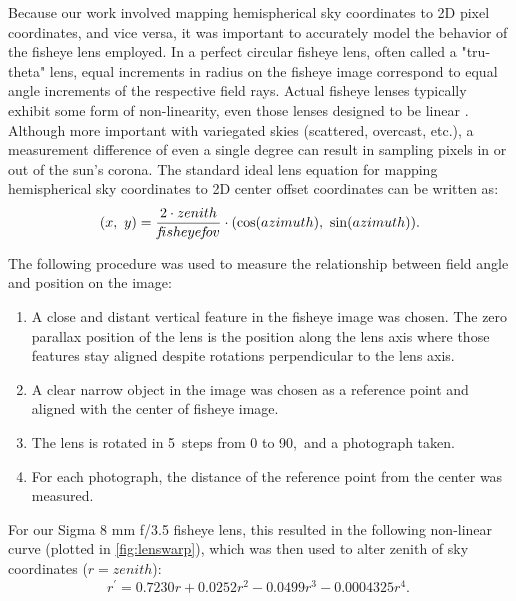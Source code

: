 Because our work involved mapping hemispherical sky coordinates to 2D pixel coordinates, and vice versa, it was important to accurately model the behavior of the fisheye lens employed. In a perfect circular fisheye lens, often called a "tru-theta" lens, equal increments in radius on the fisheye image correspond to equal angle increments of the respective field rays. Actual fisheye lenses typically exhibit some form of non-linearity, even those lenses designed to be linear \citep{bourke_fisheye}. Although more important with variegated skies (scattered, overcast, etc.), a measurement difference of even a single degree can result in sampling pixels in or out of the sun's corona. The standard ideal lens equation for mapping hemispherical sky coordinates to 2D center offset coordinates can be written as:
\begin{equation}
\label{eq:lens_ideal}
(x,~y) = \frac{2 \cdot zenith}{{\mkern-2mu f\mkern-3mu}isheye{\mkern-2mu f\mkern-3mu}ov} \cdot (\cos (azimuth) ,~\sin (azimuth))\textrm{.}
\end{equation}

The following procedure was used to measure the relationship between field angle and position on the image:
\begin{enumerate}[1.]
\item A close and distant vertical feature in the fisheye image was chosen. The zero parallax position of the lens is the position along the lens axis where those features stay aligned despite rotations perpendicular to the lens axis.
\item A clear narrow object in the image was chosen as a reference point and aligned with the center of fisheye image.
\item The lens is rotated in 5\degree~steps from 0 to 90\degree,~and a photograph taken.
\item For each photograph, the distance of the reference point from the center was measured.
\end{enumerate}
For our Sigma 8 mm f/3.5 fisheye lens, this resulted in the following non-linear curve (plotted in \autoref{fig:lenswarp}), which was then used to alter zenith of sky coordinates ($ r = zenith $):
\begin{equation}
\label{eq:lens_sigma}
r^{\prime} = 0.7230r + 0.0252r^2 - 0.0499r^3 - 0.0004325r^4\textrm{.}~
\end{equation}

